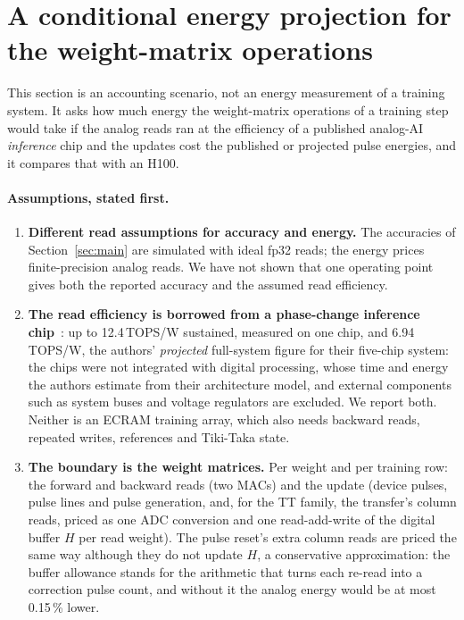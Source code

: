 \section{A conditional energy projection for the weight-matrix operations}\label{sec:energy}
This section is an accounting scenario, not an energy measurement of a training system. It asks how much energy the
weight-matrix operations of a training step would take if the analog reads ran at the efficiency of a published analog-AI
\emph{inference} chip and the updates cost the published or projected pulse energies, and it compares that with an H100.

\paragraph{Assumptions, stated first.}
\begin{enumerate}
\item \textbf{Different read assumptions for accuracy and energy.} The accuracies of Section~\ref{sec:main} are simulated with
      ideal fp32 reads; the energy prices finite-precision analog reads. We have not shown that one operating point gives both
      the reported accuracy and the assumed read efficiency.
\item \textbf{The read efficiency is borrowed from a phase-change inference chip}~\cite{ambrogio2023}: up to 12.4\,TOPS/W
      sustained, measured on one chip, and 6.94\,TOPS/W, the authors' \emph{projected} full-system figure for their five-chip
      system: the chips were not integrated with digital processing, whose time and energy the authors estimate from their
      architecture model, and external components such as system buses and voltage regulators are excluded. We report both. Neither is an ECRAM training array, which also needs
      backward reads, repeated writes, references and Tiki-Taka state.
\item \textbf{The boundary is the weight matrices.} Per weight and per training row: the forward and backward reads (two MACs)
      and the update (device pulses, pulse lines and pulse generation, and, for the TT family, the transfer's column reads, priced
      as one ADC conversion and one read-add-write of the digital buffer $H$ per read weight). The pulse reset's extra
      column reads are priced the same way although they do not update $H$, a conservative approximation: the buffer
      allowance stands for the arithmetic that turns each re-read into a correction pulse count, and without it the analog
      energy would be at most 0.15\,\% lower.

\end{enumerate}
